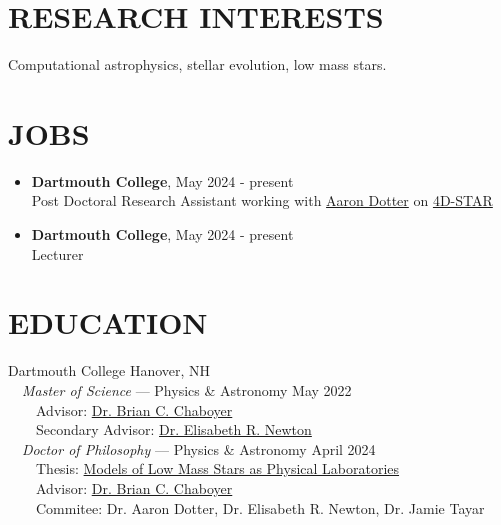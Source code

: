 \documentclass[margin, 10pt]{res} %
\begin{document}
\begin{resume}

 
\section{RESEARCH INTERESTS}  
Computational astrophysics, stellar evolution, low mass stars.
 

\section{JOBS}
\begin{itemize}
  \item \textbf{{\scriptsize Dartmouth College}}, {\small May 2024 - present} \\Post Doctoral Research Assistant working with \href{https://aarondotter.github.io/}{Aaron Dotter} on \href{https://fys.kuleuven.be/ster/research-projects/4d-star}{4D-STAR}
  \item \textbf{{\scriptsize Dartmouth College}}, {\small May 2024 - present} \\Lecturer
\end{itemize}

\section{EDUCATION}
{\large Dartmouth College} \hfill Hanover, NH\\
  {\-\ \-\ \small \textit{Master of Science} --- Physics \& Astronomy} \hfill May 2022\\
{\-\ \-\ \-\ \-\ \small Advisor: \href{https://physics.dartmouth.edu/people/brian-charles-chaboyer}{Dr. Brian C. Chaboyer}} \\
{\-\ \-\ \-\ \-\ \small Secondary Advisor: \href{https://physics.dartmouth.edu/people/elisabeth-newton}{Dr. Elisabeth R. Newton}} \\
  {\-\ \-\ \small \textit{Doctor of Philosophy} –-- Physics \& Astronomy} \hfill April 2024 \\
{\-\ \-\ \-\ \-\ \small Thesis: \href{https://raw.githubusercontent.com/tboudreaux/thesis/master/thesis/Thesis.pdf}{Models of Low Mass Stars as Physical Laboratories}} \\
{\-\ \-\ \-\ \-\ \small Advisor: \href{https://physics.dartmouth.edu/people/brian-charles-chaboyer}{Dr. Brian C. Chaboyer}} \\
{\-\ \-\ \-\ \-\ \small Commitee: Dr. Aaron Dotter, Dr. Elisabeth R. Newton, Dr. Jamie Tayar} \\


\end{resume}
\end{document}
